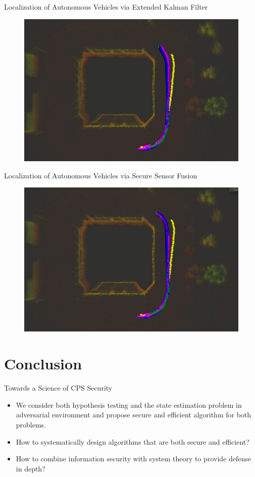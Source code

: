 \documentclass[10pt]{beamer}
\begin{document}
\begin{frame}{Localization of Autonomous Vehicles via Extended Kalman Filter}
      \begin{figure}
        \includegraphics[width=.8\textwidth]{gnssdrift.jpg}
      \end{figure}
\end{frame}

\begin{frame}{Localization of Autonomous Vehicles via Secure Sensor Fusion}
      \begin{figure}
        \includegraphics[width=.8\textwidth]{gnssdriftsafe.jpg}
      \end{figure}
\end{frame}

\section{Conclusion}

\begin{frame}{Towards a Science of CPS Security}
  \begin{itemize}
  \item We consider both hypothesis testing and the state estimation problem in adversarial environment and propose secure and efficient algorithm for both problems.
  \item How to systematically design algorithms that are both secure and efficient?
  \item How to combine information security with system theory to provide defense in depth?
  \end{itemize}
\end{frame}
\end{document}
